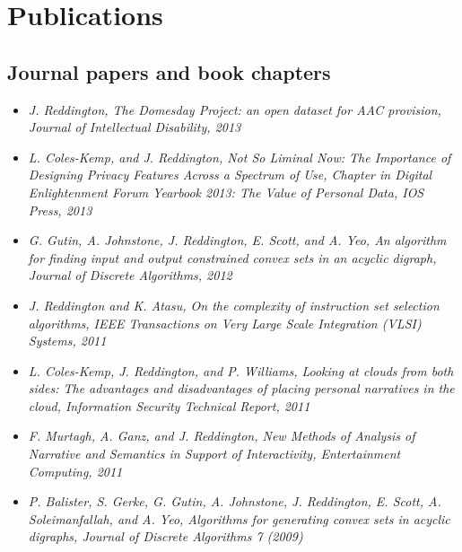 
\section*{Publications}

\subsection*{Journal papers and book chapters}
\begin{itemize}
\item{\em J. Reddington, The Domesday Project: an open dataset for AAC provision, Journal of Intellectual Disability, 2013}

\item{\em L. Coles-Kemp, and J. Reddington, Not So Liminal Now: The Importance of Designing Privacy Features Across a Spectrum of Use, Chapter in Digital Enlightenment Forum Yearbook 2013: The Value of Personal Data, IOS Press, 2013}

\item{\em G. Gutin, A. Johnstone, J. Reddington, E. Scott, and A. Yeo, An algorithm for finding input and output constrained convex sets in an acyclic digraph, Journal of Discrete Algorithms, 2012}

\item{\em J. Reddington and K. Atasu, On the complexity of instruction set selection algorithms, IEEE Transactions on Very Large Scale Integration (VLSI) Systems, 2011}

\item{\em L. Coles-Kemp, J. Reddington, and P. Williams, Looking at clouds from both sides: The advantages and disadvantages of placing personal narratives in the cloud, Information Security Technical Report, 2011}

\item{\em F. Murtagh, A. Ganz, and J. Reddington, New Methods of Analysis of Narrative and Semantics in Support of Interactivity, Entertainment Computing, 2011}

\item{\em P. Balister, S. Gerke, G. Gutin, A. Johnstone, J. Reddington, E. Scott, A. Soleimanfallah, and A. Yeo, Algorithms for generating convex sets in acyclic digraphs, Journal of Discrete Algorithms 7 (2009)}

\end{itemize}
